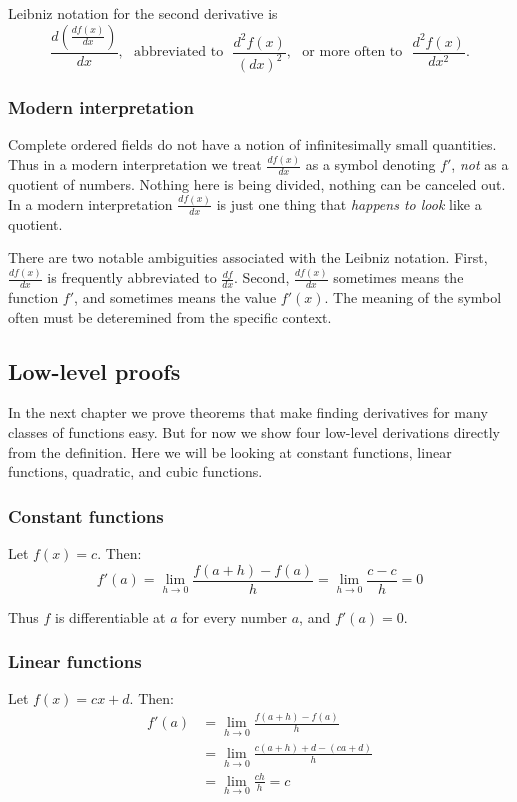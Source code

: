 \vs

Leibniz notation for the second derivative is
\[\frac{d\left(\frac{df(x)}{dx}\right)}{dx},\ \ \ \text{abbreviated
    to}\ \ \ \frac{d^2f(x)}{(dx)^2}, \ \ \ \text{or more often to}\ \
  \ \frac{d^2f(x)}{dx^2}.\]

\subsubsection*{Modern interpretation}

Complete ordered fields do not have a notion of infinitesimally small
quantities. Thus in a modern interpretation we treat
$\frac{df(x)}{dx}$ as a symbol denoting $f'$, \textit{not} as a
quotient of numbers. Nothing here is being divided, nothing can be
canceled out. In a modern interpretation $\frac{df(x)}{dx}$ is just
one thing that \textit{happens to look} like a quotient.

\vs

There are two notable ambiguities associated with the Leibniz
notation. First, $\frac{df(x)}{dx}$ is frequently abbreviated to
$\frac{df}{dx}$. Second, $\frac{df(x)}{dx}$ sometimes means the
function $f'$, and sometimes means the value $f'(x)$. The meaning of
the symbol often must be deteremined from the specific context.

\subsection{Low-level proofs}

In the next chapter we prove theorems that make finding derivatives
for many classes of functions easy. But for now we show four low-level
derivations directly from the definition. Here we will be looking at
constant functions, linear functions, quadratic, and cubic functions.

\subsubsection*{Constant functions}
Let $f(x)=c$. Then:
\[f'(a)=\lim_{h\to0}\frac{f(a+h)-f(a)}{h}=\lim_{h\to0}\frac{c-c}{h}=0\]

Thus $f$ is differentiable at $a$ for every number $a$, and $f'(a)=0$.

\subsubsection*{Linear functions}
Let $f(x)=cx+d$. Then:
\begin{align*}
  f'(a)&=\lim_{h\to0}\frac{f(a+h)-f(a)}{h}\\
       &=\lim_{h\to0}\frac{c(a+h)+d-(ca+d)}{h}\\
       &=\lim_{h\to0}\frac{ch}{h}=c
\end{align*}

